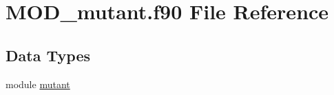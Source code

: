 \hypertarget{MOD__mutant_8f90}{\section{M\-O\-D\-\_\-mutant.\-f90 File Reference}
\label{MOD__mutant_8f90}
}
\subsection*{Data Types}
\begin{DoxyCompactItemize}
\item 
module \hyperlink{classmutant}{mutant}
\end{DoxyCompactItemize}
